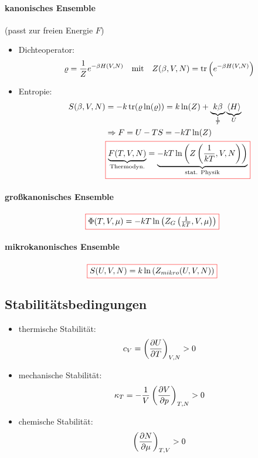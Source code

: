 \paragraph{kanonisches Ensemble} (passt zur freien Energie $F$)
\begin{itemize}
    \item[] Dichteoperator:
    \begin{equation}
        \varrho = \frac{1}{Z} e^{-\beta H(V,N)} \quad \text{mit} \quad Z(\beta,V,N) = \trace\left(e^{-\beta H(V,N)}\right)
    \end{equation}
    \item[] Entropie:
    \begin{align}
        S(\beta,V,N) &= -k \trace(\varrho \ln(\varrho)) = k \ln(Z) + \underbrace{k \beta}_{\frac{1}{T}} \underbrace{\langle H \rangle}_{U}\\
        &\Rightarrow F = U-TS = -k T \ln(Z) \\
        &\fcolorbox{red}{white}{$\underbrace{F(T,V,N)}_{\text{Thermodyn.}} = \underbrace{-k T \ln\left(Z\left(\frac{1}{kT},V,N\right)\right)}_{\text{stat. Physik}}$}
    \end{align}
\end{itemize}

\paragraph{großkanonisches Ensemble}
\begin{equation}
    \fcolorbox{red}{white}{$\Phi(T,V,\mu) = -k T \ln\left(Z_G\left(\frac{1}{kT},V,\mu\right)\right)$}
\end{equation}

\paragraph{mikrokanonisches Ensemble}
\begin{equation}
    \fcolorbox{red}{white}{$S(U,V,N) = k \ln\left(Z_{mikro}(U,V,N)\right)$}
\end{equation}


\subsection{Stabilitätsbedingungen}
\begin{itemize}
    \item thermische Stabilität:
    \begin{equation}
        c_V = \left(\pdv{U}{T}\right)_{V,N} > 0
    \end{equation}
    \item mechanische Stabilität:
    \begin{equation}
        \kappa_T = - \frac{1}{V} \left(\pdv{V}{p}\right)_{T,N} > 0
    \end{equation}
    \item chemische Stabilität:
    \begin{equation}
        \left(\pdv{N}{\mu}\right)_{T,V} > 0
    \end{equation}
\end{itemize}


